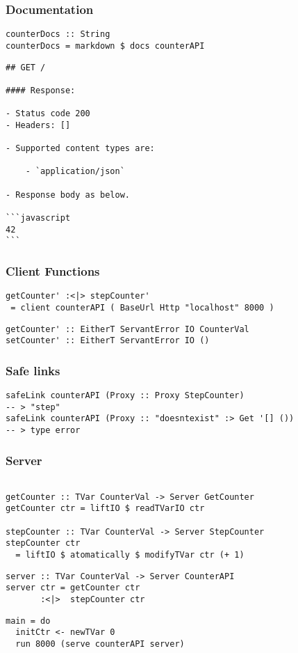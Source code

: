 \documentclass{beamer}
\begin{document}
\begin{frame}[fragile]
\frametitle{Documentation}
\begin{verbatim}
counterDocs :: String
counterDocs = markdown $ docs counterAPI
\end{verbatim}
\end{frame}

\begin{frame}[fragile]
\begin{verbatim}
## GET /

#### Response:

- Status code 200
- Headers: []

- Supported content types are:

    - `application/json`

- Response body as below.

```javascript
42
```
\end{verbatim}
\end{frame}

\begin{frame}[fragile]
\frametitle{Client Functions}
\begin{verbatim}
getCounter' :<|> stepCounter'
 = client counterAPI ( BaseUrl Http "localhost" 8000 )
\end{verbatim}
\pause
\begin{verbatim}
getCounter' :: EitherT ServantError IO CounterVal
setCounter' :: EitherT ServantError IO ()
\end{verbatim}
\end{frame}

\begin{frame}[fragile]
\frametitle{Safe links}
\begin{verbatim}
safeLink counterAPI (Proxy :: Proxy StepCounter)
-- > "step"
safeLink counterAPI (Proxy :: "doesntexist" :> Get '[] ())
-- > type error
\end{verbatim}
\end{frame}

\begin{frame}[fragile]
\frametitle{Server}
\begin{verbatim}

getCounter :: TVar CounterVal -> Server GetCounter
getCounter ctr = liftIO $ readTVarIO ctr

stepCounter :: TVar CounterVal -> Server StepCounter
stepCounter ctr
  = liftIO $ atomatically $ modifyTVar ctr (+ 1)
\end{verbatim}
\pause
\begin{verbatim}
server :: TVar CounterVal -> Server CounterAPI
server ctr = getCounter ctr
       :<|>  stepCounter ctr
\end{verbatim}
\pause
\begin{verbatim}
main = do
  initCtr <- newTVar 0
  run 8000 (serve counterAPI server)
\end{verbatim}
\end{frame}
\end{document}
